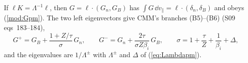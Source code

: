 If $\ell K=\Lambda^{-1}\ell$, then $G=\ell\cdot(G_n,G_B)$ has $\int G\,\dd v_\parallel=\ell\cdot(\delta_n,\delta_B)$ and obeys (\ref{mod:Gpm}). The two left eigenvectors give CMM's branches (B5)--(B6) (S09 eqs~183--184),
\begin{equation*}
  G^+=G_B+\frac{1+Z/\tau}{\sigma}\,G_n,\qquad
  G^-=G_n+\frac{2\tau}{\sigma Z\beta_i}\,G_B,\qquad
  \sigma=1+\frac{\tau}{Z}+\frac{1}{\beta_i}+\Delta,
\end{equation*}
and the eigenvalues are $1/\Lambda^\pm$ with $\Lambda^\pm$ and $\Delta$ of (\ref{eq:Lambdapm}).
